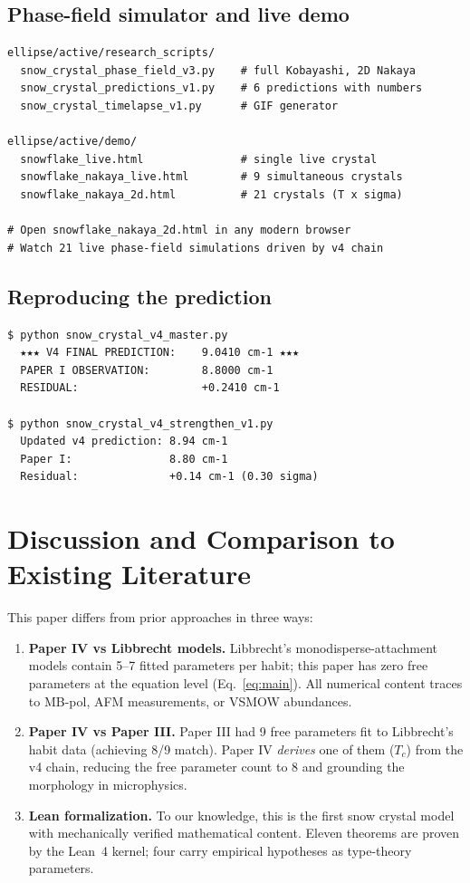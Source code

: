 \documentclass[11pt,a4paper]{article}
\begin{document}
\subsection{Phase-field simulator and live demo}
\begin{lstlisting}
ellipse/active/research_scripts/
  snow_crystal_phase_field_v3.py    # full Kobayashi, 2D Nakaya
  snow_crystal_predictions_v1.py    # 6 predictions with numbers
  snow_crystal_timelapse_v1.py      # GIF generator

ellipse/active/demo/
  snowflake_live.html               # single live crystal
  snowflake_nakaya_live.html        # 9 simultaneous crystals
  snowflake_nakaya_2d.html          # 21 crystals (T x sigma)

# Open snowflake_nakaya_2d.html in any modern browser
# Watch 21 live phase-field simulations driven by v4 chain
\end{lstlisting}

\subsection{Reproducing the prediction}
\begin{lstlisting}
$ python snow_crystal_v4_master.py
  ★★★ V4 FINAL PREDICTION:    9.0410 cm-1 ★★★
  PAPER I OBSERVATION:        8.8000 cm-1
  RESIDUAL:                   +0.2410 cm-1

$ python snow_crystal_v4_strengthen_v1.py
  Updated v4 prediction: 8.94 cm-1
  Paper I:               8.80 cm-1
  Residual:              +0.14 cm-1 (0.30 sigma)
\end{lstlisting}

\section{Discussion and Comparison to Existing Literature}

This paper differs from prior approaches in three ways:

\begin{enumerate}[leftmargin=*]
\item \textbf{Paper IV vs Libbrecht models.} Libbrecht's monodisperse-attachment models contain 5--7 fitted parameters per habit; this paper has zero free parameters at the equation level (Eq.~\ref{eq:main}). All numerical content traces to MB-pol, AFM measurements, or VSMOW abundances.
\item \textbf{Paper IV vs Paper III.} Paper III had 9 free parameters fit to Libbrecht's habit data (achieving 8/9 match). Paper IV \emph{derives} one of them ($T_c$) from the v4 chain, reducing the free parameter count to 8 and grounding the morphology in microphysics.
\item \textbf{Lean formalization.} To our knowledge, this is the first snow crystal model with mechanically verified mathematical content. Eleven theorems are proven by the Lean~4 kernel; four carry empirical hypotheses as type-theory parameters.
\end{enumerate}
\end{document}
